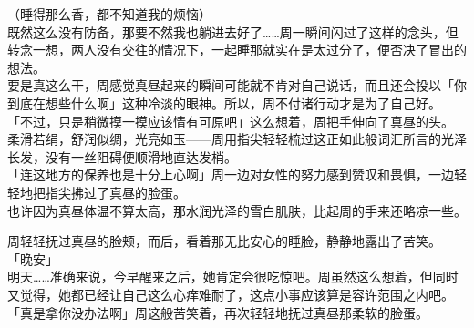 （睡得那么香，都不知道我的烦恼）\\

既然这么没有防备，那要不然我也躺进去好了……周一瞬间闪过了这样的念头，但转念一想，两人没有交往的情况下，一起睡那就实在是太过分了，便否决了冒出的想法。\\

要是真这么干，周感觉真昼起来的瞬间可能就不肯对自己说话，而且还会投以「你到底在想些什么啊」这种冷淡的眼神。所以，周不付诸行动才是为了自己好。\\

「不过，只是稍微摸一摸应该情有可原吧」这么想着，周把手伸向了真昼的头。\\

柔滑若绢，舒润似绸，光亮如玉——周用指尖轻轻梳过这正如此般词汇所言的光泽长发，没有一丝阻碍便顺滑地直达发梢。\\

「连这地方的保养也是十分上心啊」周一边对女性的努力感到赞叹和畏惧，一边轻轻地把指尖拂过了真昼的脸蛋。\\

也许因为真昼体温不算太高，那水润光泽的雪白肌肤，比起周的手来还略凉一些。

周轻轻抚过真昼的脸颊，而后，看着那无比安心的睡脸，静静地露出了苦笑。\\

「晚安」\\

明天……准确来说，今早醒来之后，她肯定会很吃惊吧。周虽然这么想着，但同时又觉得，她都已经让自己这么心痒难耐了，这点小事应该算是容许范围之内吧。\\

「真是拿你没办法啊」周这般苦笑着，再次轻轻地抚过真昼那柔软的脸蛋。

